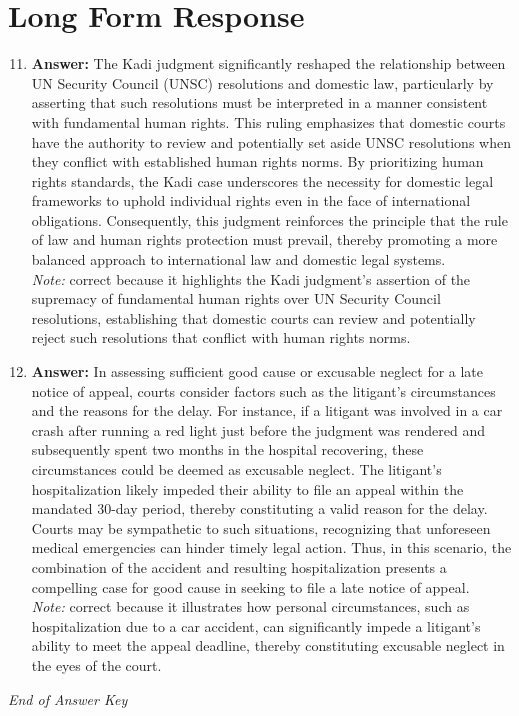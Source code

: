 \documentclass[12pt]{article}
\begin{document}
\section*{Long Form Response}
\begin{enumerate}[label=\arabic*.]
\setcounter{enumi}{10}
\item \textbf{Answer:} The Kadi judgment significantly reshaped the relationship between UN Security Council (UNSC) resolutions and domestic law, particularly by asserting that such resolutions must be interpreted in a manner consistent with fundamental human rights. This ruling emphasizes that domestic courts have the authority to review and potentially set aside UNSC resolutions when they conflict with established human rights norms. By prioritizing human rights standards, the Kadi case underscores the necessity for domestic legal frameworks to uphold individual rights even in the face of international obligations. Consequently, this judgment reinforces the principle that the rule of law and human rights protection must prevail, thereby promoting a more balanced approach to international law and domestic legal systems.
\\ \textit{Note:} correct because it highlights the Kadi judgment's assertion of the supremacy of fundamental human rights over UN Security Council resolutions, establishing that domestic courts can review and potentially reject such resolutions that conflict with human rights norms.
\item \textbf{Answer:} In assessing sufficient good cause or excusable neglect for a late notice of appeal, courts consider factors such as the litigant's circumstances and the reasons for the delay. For instance, if a litigant was involved in a car crash after running a red light just before the judgment was rendered and subsequently spent two months in the hospital recovering, these circumstances could be deemed as excusable neglect. The litigant's hospitalization likely impeded their ability to file an appeal within the mandated 30-day period, thereby constituting a valid reason for the delay. Courts may be sympathetic to such situations, recognizing that unforeseen medical emergencies can hinder timely legal action. Thus, in this scenario, the combination of the accident and resulting hospitalization presents a compelling case for good cause in seeking to file a late notice of appeal.
\\ \textit{Note:} correct because it illustrates how personal circumstances, such as hospitalization due to a car accident, can significantly impede a litigant's ability to meet the appeal deadline, thereby constituting excusable neglect in the eyes of the court.
\end{enumerate}

\vfill
\noindent\textit{End of Answer Key}
\end{document}
